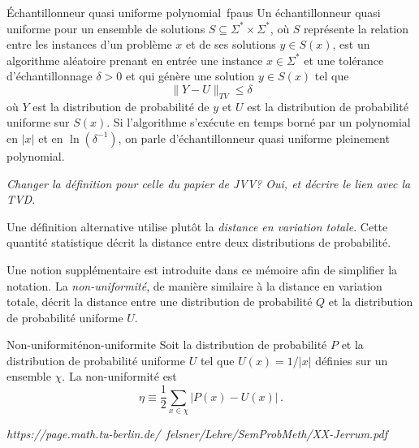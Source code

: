 \begin{maindefinition}{Échantillonneur quasi uniforme polynomial~\cite{jerrumCountingSamplingIntegrating2003}}{fpaus}
    Un échantillonneur quasi uniforme pour un ensemble de solutions $S \subseteq \Sigma^{*} \times \Sigma^{*}$, où $S$ représente la relation entre les instances d'un problème $x$ et de ses solutions $y \in  S(x)$, est un algorithme aléatoire prenant en entrée une instance $x \in \Sigma^{*}$ et une tolérance d'échantillonnage $\delta > 0$ et qui génère une solution $y \in S(x)$ tel que
    \begin{equation*}
        \lVert Y - U \rVert_{TV} \leq \delta 
    \end{equation*}
    où $Y$ est la distribution de probabilité de $y$ et $U$ est la distribution de probabilité uniforme sur $S(x)$. Si l'algorithme s'exécute en temps borné par un polynomial en $\lvert x \rvert$ et en $\ln (\delta^{-1})$, on parle d'échantillonneur quasi uniforme pleinement polynomial.
\end{maindefinition}

\textcolor{mydarkred}{\textit{Changer la définition pour celle du papier de JVV? Oui, et décrire le lien avec la TVD.}}

Une définition alternative utilise plutôt la \textit{distance en variation totale}. Cette quantité statistique décrit la distance entre deux distributions de probabilité.



Une notion supplémentaire est introduite dans ce mémoire afin de simplifier la notation. La \textit{non-uniformité}, de manière similaire à la distance en variation totale, décrit la distance entre une distribution de probabilité $Q$ et la distribution de probabilité uniforme $U$.

\begin{maindefinition}{Non-uniformité}{non-uniformite}
    Soit la distribution de probabilité $P$ et la distribution de probabilité uniforme $U$ tel que $U(x) = 1/\lvert x \rvert$ définies sur un ensemble $\chi$. La non-uniformité est
    \begin{equation*}
        \eta \equiv \frac{1}{2} \sum_{x \in \chi} \lvert P(x) - U(x) \rvert \,. 
    \end{equation*}
\end{maindefinition}

\textcolor{mydarkred}{\textit{https://page.math.tu-berlin.de/~felsner/Lehre/SemProbMeth/XX-Jerrum.pdf}}



